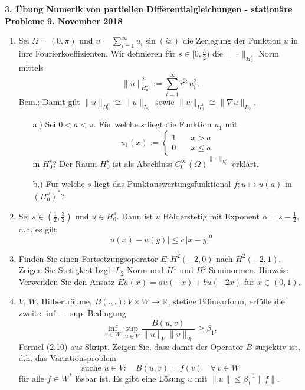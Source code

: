 \documentclass[11pt,a4paper]{report}
\newcommand{\R}[1]{\mathbb{R}^{#1}}
\begin{document}
\begin{center}
\textbf{3. \"Ubung Numerik von partiellen Differentialgleichungen - station\"are Probleme} \newline 
\textbf{9. November 2018}
\end{center}
\begin{enumerate}


\item Sei $\Omega = (0,\pi)$ und $u = \sum\limits_{i=1}^\infty u_i\sin(ix)$ die Zerlegung der Funktion $u$ in ihre Fourierkoeffizienten. Wir definieren f\"ur $s \in [0,\frac{3}{2})$ die $\| \cdot \|_{H_0^s}$ Norm mittels
$$\| u \|^2_{H_0^s}:= \sum\limits_{i=1}^\infty i^{2s} u_i^2 . $$
Bem.: Damit gilt $\| u \|_{H_0^0} \cong \| u \| _{L_2}$ sowie $\| u \|_{H_0^1} \cong \| \nabla u \|_{L_2} $.
\begin{itemize}
\item[a.)] Sei $0<a<\pi$. F\"ur welche $s$ liegt die Funktion $u_1$ mit $$u_1(x):=\left\{\begin{aligned} 1 & \quad x>a \\ 0 & \quad x\leq a \end{aligned}\right.$$ in $H_0^s$? Der Raum $H_0^s$ ist als Abschluss $\overline{C_0^\infty(\Omega)}^{\|\cdot\|_{H_0^s}}$ erkl\"art.
\item[b.)] F\"ur welche $s$ liegt das Punktauswertungsfunktional $f: u\mapsto u(a)$ in $(H_0^s)^*$?
\end{itemize}


\item Sei $s \in(\frac{1}{2}, \frac{3}{2})$ und $u \in H_0^s$. Dann ist $u$ H\"olderstetig mit Exponent $\alpha = s-\frac{1}{2}$, d.h. es gilt
$$|u(x)-u(y) | \leq c\,|x-y|^\alpha $$

\item Finden Sie einen Fortsetzungsoperator $E : H^2(-2,0)$ nach
  $H^2(-2,1)$. Zeigen Sie Stetigkeit bzgl. $L_2$-Norm und $H^1$ und
  $H^2$-Seminormen.  Hinweis: Verwenden Sie den Ansatz $Eu(x) = a
  u(-x) + b u(-2x)$ f\"ur $x \in (0,1)$. 



\item $V$, $W$, Hilbertr\"aume,  $B(.,.) : V \times W \rightarrow \R{}$,
  stetige Bilinearform, erf\"ulle die zweite $\inf-\sup$ Bedingung 
$$
\inf_{v \in W} \sup_{u \in V} \frac{B(u,v)}{\|u\|_V \| v\|_W} \geq \beta_1,
$$
Formel (2.10) aus Skript. Zeigen Sie, dass damit der Operator $B$
surjektiv ist, d.h. das Variationsproblem
$$
\text{suche } u \in V: \quad B(u,v) = f(v) \quad \forall \, v \in W
$$
 f\"ur alle $f \in W^\ast$ l\"osbar ist. Es gibt eine L\"osung $u$
 mit $\|u \| \leq \beta_1^{-1} \| f\|$.  


\end{enumerate}
\end{document}
